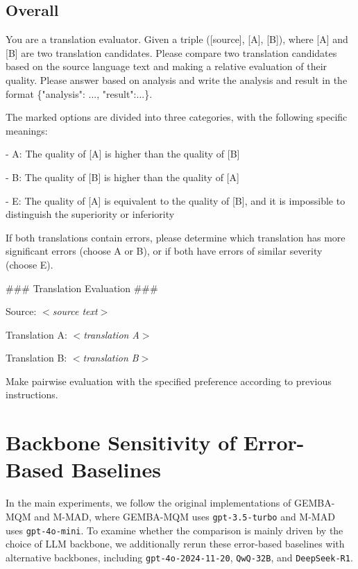 \documentclass{article}
\theoremstyle{plain}
\theoremstyle{definition}
\theoremstyle{remark}
\begin{document}
\subsection{Overall}
\begin{tcolorbox}[colback=gray!10, colframe=gray!80, width=\textwidth,title=Prompt: Overall, breakable]
You are a translation evaluator. Given a triple ([source], [A], [B]), where [A] and [B] are two translation candidates. Please compare two translation candidates based on the source language text and making a relative evaluation of their quality. Please answer based on analysis and write the analysis and result in the format \{"analysis": ..., "result":...\}.

The marked options are divided into three categories, with the following specific meanings:

\quad - A: The quality of [A] is higher than the quality of [B]

\quad - B: The quality of [B] is higher than the quality of [A]

\quad - E: The quality of [A] is equivalent to the quality of [B], and it is impossible to distinguish the superiority or inferiority

If both translations contain errors, please determine which translation has more significant errors (choose A or B), or if both have errors of similar severity (choose E).

\text{}

\#\#\# Translation Evaluation \#\#\#

Source: \textit{$<$source text$>$}

Translation A: \textit{$<$translation A$>$}

Translation B: \textit{$<$translation B$>$}

Make pairwise evaluation with the specified preference according to previous instructions.
\end{tcolorbox}

\section{Backbone Sensitivity of Error-Based Baselines}\label{appx:controlled_backbone}
In the main experiments, we follow the original implementations of GEMBA-MQM and M-MAD, where GEMBA-MQM uses \texttt{gpt-3.5-turbo} and M-MAD uses \texttt{gpt-4o-mini}. To examine whether the comparison is mainly driven by the choice of LLM backbone, we additionally rerun these error-based baselines with alternative backbones, including \texttt{gpt-4o-2024-11-20}, \texttt{QwQ-32B}, and \texttt{DeepSeek-R1}.
\end{document}

